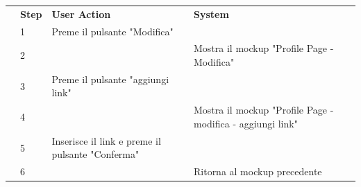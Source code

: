 \begin{table}[H]
\begin{tabularx}{\linewidth}{|p{135pt}|p{25pt}|>{\raggedright\arraybackslash}X|>{\raggedright\arraybackslash}X|}
		\hline \rowcolor[HTML]{DCDCDC}
		\multirow{1}{*}{}{\textbf{\sffamily Description}}  & \textbf{\sffamily Step}                                                                                                                                                    & \textbf{\sffamily User Action}                   & \textbf{\sffamily System}                                                                 \\
		\cline{2-4}                                        & 1                                                                                                                                                                          & Preme il pulsante "Modifica"                     &                                                                                           \\
		\cline{2-4}                                        & 2                                                                                                                                                                          &                                                  & Mostra il mockup "Profile Page - Modifica"                                                \\
		\cline{2-4}                                        & 3                                                                                                                                                                          & Preme il pulsante "aggiungi link"                &                                                                                           \\
		\cline{2-4}                                        & 4                                                                                                                                                                          &                                                  & Mostra il mockup "Profile Page - modifica - aggiungi link"                                \\
		\cline{2-4}                                        & 5                                                                                                                                                                          & Inserisce il link e preme il pulsante "Conferma" &                                                                                           \\
		\cline{2-4}                                        & 6                                                                                                                                                                          &                                                  & Ritorna al mockup precedente                                                              \\

\end{tabularx}
\end{table}
